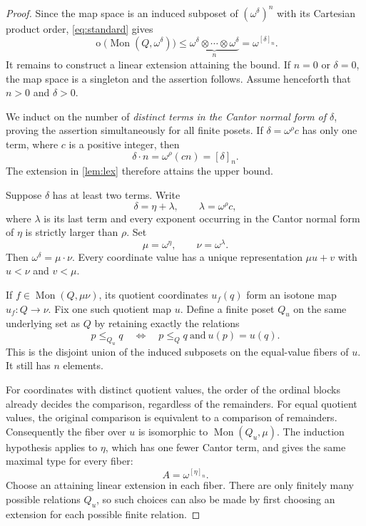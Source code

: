 \documentclass[11pt,a4paper]{article}
\theoremstyle{definition}
\theoremstyle{remark}
\newcommand{\Mon}{\operatorname{Mon}}
\newcommand{\otype}{\operatorname{o}}
\newcommand{\Nrep}[2]{\left[#1\right]_{#2}}
\begin{document}
\begin{proof}
Since the map space is an induced subposet of $(\omega^\delta)^n$ with
its Cartesian product order, \eqref{eq:standard} gives
\[
 \otype\bigl(\Mon(Q,\omega^\delta)\bigr)
 \leq\underbrace{\omega^\delta\otimes\cdots\otimes\omega^\delta}_{n}
 =\omega^{\Nrep{\delta}{n}}.
\]
It remains to construct a linear extension attaining the bound. If $n=0$
or $\delta=0$, the map space is a singleton and the assertion follows.
Assume henceforth that $n>0$ and $\delta>0$.

We induct on the number of \emph{distinct terms in the Cantor normal form
of $\delta$}, proving the assertion simultaneously for all finite posets.
If $\delta=\omega^\rho c$ has only one term, where $c$ is a positive
integer, then
\[
 \delta\cdot n=\omega^\rho(cn)=\Nrep{\delta}{n}.
\]
The extension in \cref{lem:lex} therefore attains the upper bound.

Suppose $\delta$ has at least two terms. Write
\[
 \delta=\eta+\lambda,
 \qquad \lambda=\omega^\rho c,
\]
where $\lambda$ is its last term and every exponent occurring in the
Cantor normal form of $\eta$ is strictly larger than $\rho$. Set
\[
 \mu=\omega^\eta,\qquad \nu=\omega^\lambda.
\]
Then $\omega^\delta=\mu\cdot\nu$. Every coordinate value has a unique
representation $\mu u+v$ with $u<\nu$ and $v<\mu$.

If $f\in\Mon(Q,\mu\nu)$, its quotient coordinates $u_f(q)$ form an
isotone map $u_f:Q\to\nu$. Fix one such quotient map $u$. Define a finite
poset $Q_u$ on the same underlying set as $Q$ by retaining exactly the
relations
\[
 p\leq_{Q_u}q
 \quad\Longleftrightarrow\quad
 p\leq_Qq\ \text{and}\ u(p)=u(q).
\]
This is the disjoint union of the induced subposets on the equal-value
fibers of $u$. It still has $n$ elements.

For coordinates with distinct quotient values, the order of the ordinal
blocks already decides the comparison, regardless of the remainders.
For equal quotient values, the original comparison is equivalent to a
comparison of remainders. Consequently the fiber over $u$ is isomorphic to
$\Mon(Q_u,\mu)$. The induction hypothesis applies to $\eta$, which has
one fewer Cantor term, and gives the same maximal type for every fiber:
\[
 A=\omega^{\Nrep{\eta}{n}}.
\]
Choose an attaining linear extension in each fiber. There are only
finitely many possible relations $Q_u$, so such choices can also be made
by first choosing an extension for each possible finite relation.


\end{proof}
\end{document}
